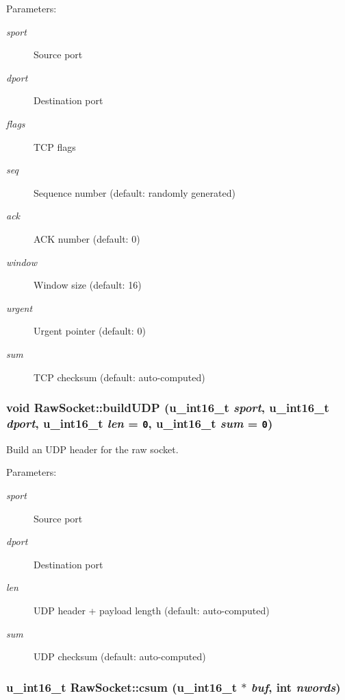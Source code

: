 \begin{Desc}
\item[Parameters:]
\begin{description}
\item[{\em sport}]Source port \item[{\em dport}]Destination port \item[{\em flags}]TCP flags \item[{\em seq}]Sequence number (default: randomly generated) \item[{\em ack}]ACK number (default: 0) \item[{\em window}]Window size (default: 16) \item[{\em urgent}]Urgent pointer (default: 0) \item[{\em sum}]TCP checksum (default: auto-computed) \end{description}
\end{Desc}
\hypertarget{classRawSocket_90915831a7ac1046e07635da346a54fe}{
\subsubsection[{buildUDP}]{\setlength{\rightskip}{0pt plus 5cm}void RawSocket::buildUDP (u\_\-int16\_\-t {\em sport}, \/  u\_\-int16\_\-t {\em dport}, \/  u\_\-int16\_\-t {\em len} = {\tt 0}, \/  u\_\-int16\_\-t {\em sum} = {\tt 0})}}
\label{classRawSocket_90915831a7ac1046e07635da346a54fe}


Build an UDP header for the raw socket. 

\begin{Desc}
\item[Parameters:]
\begin{description}
\item[{\em sport}]Source port \item[{\em dport}]Destination port \item[{\em len}]UDP header + payload length (default: auto-computed) \item[{\em sum}]UDP checksum (default: auto-computed) \end{description}
\end{Desc}
\hypertarget{classRawSocket_973b337d963bdcff3ce68d0ef7ffb7e1}{
\subsubsection[{csum}]{\setlength{\rightskip}{0pt plus 5cm}u\_\-int16\_\-t RawSocket::csum (u\_\-int16\_\-t $\ast$ {\em buf}, \/  int {\em nwords})}}
\label{classRawSocket_973b337d963bdcff3ce68d0ef7ffb7e1}


